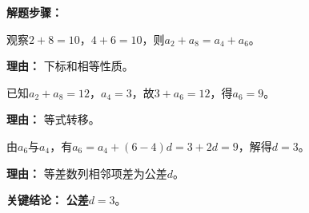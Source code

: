 \begin{examplebox}
\textbf{\textcolor{CExample}{解题步骤：}}
\begin{description}[style=nextline, leftmargin=2.8em, labelsep=0.5em, itemsep=0.45em]
    \item[\textbf{第一步（配对关系）：}] 观察$2+8=10$，$4+6=10$，则$a_2+a_8 = a_4+a_6$。
    \par\textbf{理由：} 下标和相等性质。
    \item[\textbf{第二步（代入已知）：}] 已知$a_2+a_8=12$，$a_4=3$，故$3 + a_6 = 12$，得$a_6=9$。
    \par\textbf{理由：} 等式转移。
    \item[\textbf{第三步（求公差）：}] 由$a_6$与$a_4$，有$a_6 = a_4 + (6-4)d = 3 + 2d = 9$，解得$d=3$。
    \par\textbf{理由：} 等差数列相邻项差为公差$d$。
\end{description}

\textbf{\textcolor{CExample}{关键结论：}} \textbf{公差$d=3$}。
\end{examplebox}

